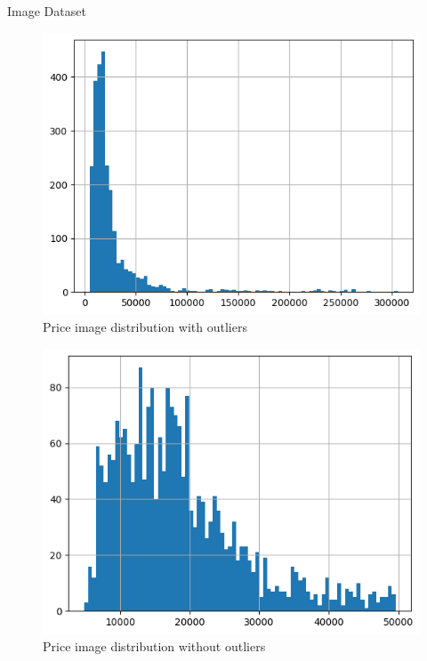 \documentclass{beamer}
\begin{document}
    \begin{frame}{Image Dataset} 
        
        \begin{figure}
        \includegraphics[width=0.35\linewidth]{price_image_distribution_1.png}
        \caption{Price image distribution with outliers}
        \end{figure}
        \begin{figure}\includegraphics[width=0.35\linewidth]{price_image_distribution_2.png}
        \caption{Price image distribution without outliers}
        \end{figure}
    \end{frame}
\end{document}
